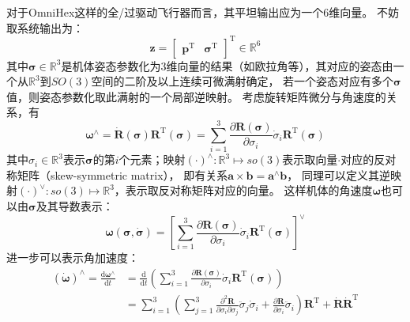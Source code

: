 对于OmniHex这样的全/过驱动飞行器而言，其平坦输出应为一个6维向量。
不妨取系统输出为：
\begin{equation}
    \bm{z} = 
    \begin{bmatrix}
        \bm{p}^{\text{T}} & \bm{\sigma}^{\text{T}}
    \end{bmatrix}^{\text{T}} \in \mathbb{R}^6
    \label{equ:omnihex_output}
\end{equation}
其中$\bm{\sigma} \in \mathbb{R}^3$是机体姿态参数化为3维向量的结果（如欧拉角等），其对应的姿态由一个从$\mathbb{R}^3$到$SO(3)$空间的二阶及以上连续可微满射确定，
若一个姿态对应有多个$\bm{\sigma}$值，则姿态参数化取此满射的一个局部逆映射。
考虑旋转矩阵微分与角速度的关系，有
\begin{equation}
    \bm{\omega}^{\wedge}
     = \dot{\bm{R}}(\bm{\sigma})\bm{R}^{\text{T}}(\bm{\sigma})
     = \sum_{i=1}^3 \frac{\partial \bm{R}(\bm{\sigma})}{\partial \sigma_i}\dot{\sigma}_i\bm{R}^{\text{T}}(\bm{\sigma})
     \label{equ:dsigma_to_omega_hat}
\end{equation}
其中$\sigma_i \in \mathbb{R}^3$表示$\bm{\sigma}$的第$i$个元素；映射$(\cdot)^{\wedge}:\mathbb{R}^3 \mapsto so(3)$表示取向量$\cdot$对应的反对称矩阵（skew-symmetric matrix），
即有关系$\bm{a} \times \bm{b} = \bm{a}^{\wedge}\bm{b}$，
同理可以定义其逆映射$(\cdot)^{\vee}:so(3) \mapsto \mathbb{R}^3$，表示取反对称矩阵对应的向量。
这样机体的角速度$\bm{\omega}$也可以由$\bm{\sigma}$及其导数表示：
\begin{equation}
    \bm{\omega}(\bm{\sigma}, \dot{\bm{\sigma}}) = 
    \left[
        \sum_{i=1}^3 \frac{\partial \bm{R}(\bm{\sigma})}{\partial \sigma_i}\dot{\sigma}_i\bm{R}^{\text{T}}(\bm{\sigma})
    \right]^{\vee}
    \label{equ:dsigma_to_omega}
\end{equation}
进一步可以表示角加速度：
\begin{equation}
    \begin{aligned}
        (\dot{\bm{\omega}})^{\wedge} = \frac{\text{d}\bm{\omega}^{\wedge}}{\text{d}t} &=
        \frac{\text{d}}{\text{d}t}\left(\sum_{i=1}^3 \frac{\partial \bm{R}(\bm{\sigma})}{\partial \sigma_i}\dot{\sigma}_i\bm{R}^{\text{T}}(\bm{\sigma})\right) \\
        &= \sum_{i=1}^3 \left(\sum_{j=1}^3 \frac{\partial^2 \bm{R}}{\partial\sigma_i\partial\sigma_j}\ddot{\sigma}_j\dot{\sigma}_i + \frac{\partial \bm{R}}{\partial \sigma_i}\ddot{\sigma}_i\right)\bm{R}^{\text{T}} + 
        \dot{\bm{R}}\dot{\bm{R}}^{\text{T}}
    \end{aligned}
    \label{equ:dsigma_to_d1omega}
\end{equation}
